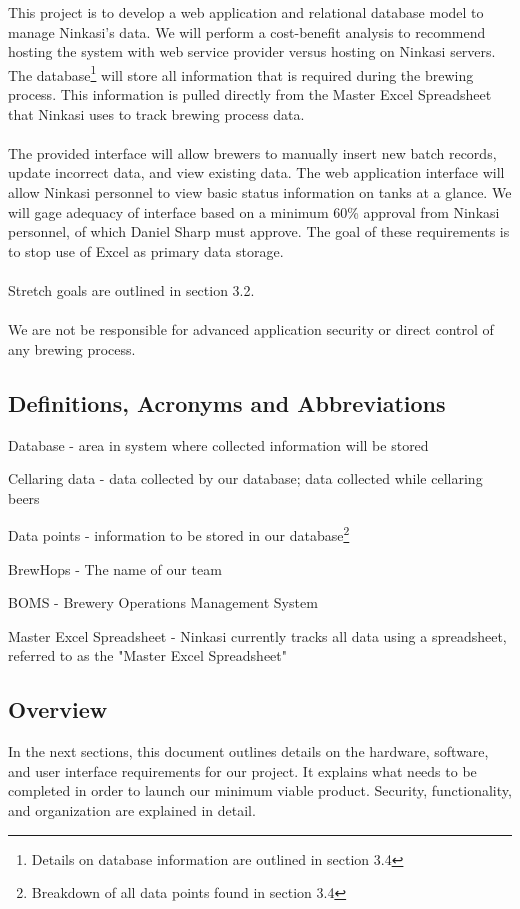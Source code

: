 \documentclass[draftclsnofoot,onecolumn,letterpaper,10pt,compsoc]{IEEEtran}
\begin{document}
		This project is to develop a web application and relational database model to manage Ninkasi's data.
		We will perform a cost-benefit analysis to recommend hosting the system with web service provider versus hosting on Ninkasi servers.
		The database\footnote{Details on database information are outlined in section 3.4} will store all information that is required during the brewing process.
        This information is pulled directly from the Master Excel Spreadsheet that Ninkasi uses to track brewing process data.
        \\
        \\
		The provided interface will allow brewers to manually insert new batch records, update incorrect data, and view existing data.
		The web application interface will allow Ninkasi personnel to view basic status information on tanks at a glance.
		We will gage adequacy of interface based on a minimum 60\% approval from Ninkasi personnel, of which Daniel Sharp must approve.
		The goal of these requirements is to stop use of Excel as primary data storage.
		\\
		\\
		Stretch goals are outlined in section 3.2.
		\\
		\\
		We are not be responsible for advanced application security or direct control of any brewing process.

	\subsection{Definitions, Acronyms and Abbreviations}
        Database - area in system where collected information will be stored
        
        Cellaring data - data collected by our database; data collected while cellaring beers
    
		Data points - information to be stored in our database\footnote{Breakdown of all data points found in section 3.4}

		BrewHops - The name of our team

		BOMS - Brewery Operations Management System
        
        Master Excel Spreadsheet - Ninkasi currently tracks all data using a spreadsheet, referred to as the "Master Excel Spreadsheet"

	\subsection{Overview}
		In the next sections, this document outlines details on the hardware, software, and user interface requirements for our project.
		It explains what needs to be completed in order to launch our minimum viable product.
		Security, functionality, and organization are explained in detail.
\end{document}
